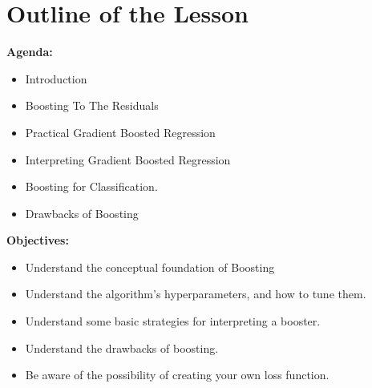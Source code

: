 \section{Outline of the Lesson}
%
\begin{frame}
\textbf{Agenda:}
 
  \begin{itemize}
    \item Introduction
    \item Boosting To The Residuals
    \item Practical Gradient Boosted Regression
    \item Interpreting Gradient Boosted Regression
    \item Boosting for Classification.
    \item Drawbacks of Boosting
  \end{itemize}

\end{frame}
%
\begin{frame}
\textbf{Objectives:}

  \begin{itemize}
    \item Understand the conceptual foundation of Boosting
    \item Understand the algorithm's hyperparameters, and how to tune them.
    \item Understand some basic strategies for interpreting a booster.
    \item Understand the drawbacks of boosting.
    \item Be aware of the possibility of creating your own loss function.
  \end{itemize}
  
\end{frame}